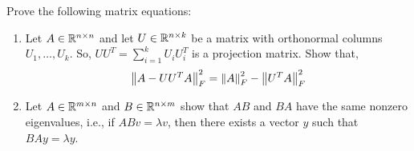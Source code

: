 \documentclass[10pt]{article}
\begin{document}
\maketitle

\begin{problem}[Problem 1]
Prove the following matrix equations:
\begin{enumerate}[label=(\alph*),nolistsep]
    \item Let \( A\in\mathbb{R}^{n\times n} \) and let \( U \in \mathbb{R}^{n\times k} \) be a matrix with orthonormal columns \( U_1,\ldots, U_k \). So, \( UU^T = \sum_{i=1}^{k} U_iU_i^T \) is a projection matrix. Show that,
        \begin{align*}
            \left\lVert A-UU^TA\right\rVert_F^2 = \left\lVert A\right\rVert_F^2-\left\lVert U^TA\right\rVert_F^2
        \end{align*}
        
    \item Let \( A \in \mathbb{R}^{m\times n} \) and \( B\in\mathbb{R}^{n\times m} \) show that \( AB \) and \( BA \) have the same nonzero eigenvalues, i.e., if \( ABv = \lambda v \), then there exists a vector \( y \) such that \( BAy = \lambda y \). 

\end{enumerate}
\end{problem}
\end{document}
